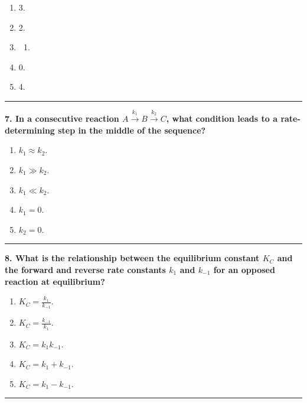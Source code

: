 \documentclass[
  9pt,
]{extbook}
\providecommand{\tightlist}{%
  \setlength{\itemsep}{0pt}\setlength{\parskip}{0pt}}
\theoremstyle{definition}
\theoremstyle{definition}
\theoremstyle{definition}
\theoremstyle{definition}
\theoremstyle{remark}
\begin{document}
\begin{enumerate}
\def\labelenumi{\alph{enumi}.}
\tightlist
\item
  3.
\item
  2.
\item
  \begin{enumerate}
  \def\labelenumii{\arabic{enumii}.}
  \tightlist
  \item
  \end{enumerate}
\item
  0.
\item
  4.
\end{enumerate}

\begin{center}\rule{0.5\linewidth}{0.5pt}\end{center}

\textbf{7. In a consecutive reaction \(A \xrightarrow{k_1} B \xrightarrow{k_2} C\), what condition leads to a rate-determining step in the middle of the sequence?}

\begin{enumerate}
\def\labelenumi{\alph{enumi}.}
\tightlist
\item
  \(k_1 \approx k_2\).
\item
  \(k_1 \gg k_2\).
\item
  \(k_1 \ll k_2\).
\item
  \(k_1 = 0\).
\item
  \(k_2 = 0\).
\end{enumerate}

\begin{center}\rule{0.5\linewidth}{0.5pt}\end{center}

\textbf{8. What is the relationship between the equilibrium constant \(K_C\) and the forward and reverse rate constants \(k_1\) and \(k_{-1}\) for an opposed reaction at equilibrium?}

\begin{enumerate}
\def\labelenumi{\alph{enumi}.}
\tightlist
\item
  \(K_C = \frac{k_1}{k_{-1}}\).
\item
  \(K_C = \frac{k_{-1}}{k_1}\).
\item
  \(K_C = k_1 k_{-1}\).
\item
  \(K_C = k_1 + k_{-1}\).
\item
  \(K_C = k_1 - k_{-1}\).
\end{enumerate}

\begin{center}\rule{0.5\linewidth}{0.5pt}\end{center}
\end{document}
